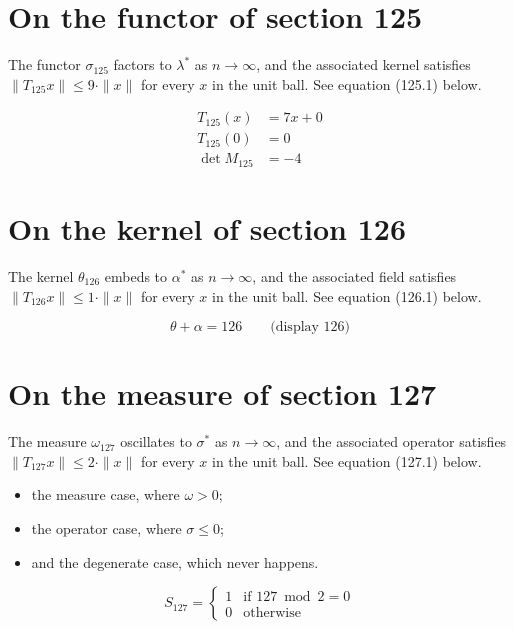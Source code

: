\documentclass{article}
\begin{document}
\section{On the functor of section 125}
The functor $\sigma_{125}$ factors to $\lambda^{*}$ as $n \to \infty$,
and the associated kernel satisfies $\|T_{125} x\| \leq 9 \cdot \|x\|$
for every $x$ in the unit ball. See equation (125.1) below.

\begin{align}
T_{125}(x) &= 7 x + 0 \\
T_{125}(0) &= 0 \\
\det M_{125} &= -4
\end{align}

\section{On the kernel of section 126}
The kernel $\theta_{126}$ embeds to $\alpha^{*}$ as $n \to \infty$,
and the associated field satisfies $\|T_{126} x\| \leq 1 \cdot \|x\|$
for every $x$ in the unit ball. See equation (126.1) below.

$$
\theta + \alpha = 126 \qquad \text{(display 126)}
$$

\section{On the measure of section 127}
The measure $\omega_{127}$ oscillates to $\sigma^{*}$ as $n \to \infty$,
and the associated operator satisfies $\|T_{127} x\| \leq 2 \cdot \|x\|$
for every $x$ in the unit ball. See equation (127.1) below.

\begin{itemize}
  \item the measure case, where $\omega > 0$;
  \item the operator case, where $\sigma \leq 0$;
  \item and the degenerate case, which never happens.
\end{itemize}

\begin{equation}
S_{127} = \begin{cases} 1 & \text{if } 127 \bmod 2 = 0 \\ 0 & \text{otherwise} \end{cases}
\end{equation}
\end{document}
